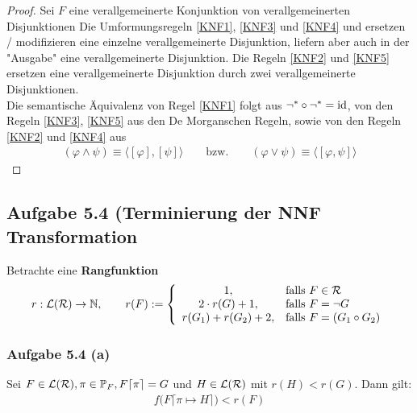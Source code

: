\begin{proof}
	Sei $F$ eine verallgemeinerte Konjunktion von verallgemeinerten Disjunktionen
	Die Umformungsregeln \eqref{KNF1}, \eqref{KNF3} und \eqref{KNF4} und ersetzen / modifizieren eine einzelne verallgemeinerte Disjunktion, liefern aber auch in der "Ausgabe" eine verallgemeinerte Disjunktion. 
	Die Regeln \eqref{KNF2} und \eqref{KNF5} ersetzen eine verallgemeinerte Disjunktion durch zwei verallgemeinerte Disjunktionen.\\
	Die semantische Äquivalenz von Regel \eqref{KNF1} folgt aus $\neg^\ast\circ\neg^\ast=\operatorname{id}$, von den Regeln \eqref{KNF3}, \eqref{KNF5} aus den De Morganschen  Regeln, sowie von den Regeln \eqref{KNF2} und \eqref{KNF4} aus 
	\begin{align*}
		(\varphi\wedge\psi)\equiv\big\langle[\varphi],[\psi]\big\rangle
		\qquad\text{bzw.}\qquad
		(\varphi\vee\psi)\equiv\big\langle[\varphi,\psi]\big\rangle
	\end{align*}
\end{proof}

\subsection{Aufgabe 5.4 (Terminierung der NNF Transformation}
Betrachte eine \textbf{Rangfunktion}
\begin{align*}
	r:\mathcal{L}(\mathcal{R})\to\mathbb{N},\qquad r(F):=\left\lbrace\begin{array}{cl}
		1, &\text{falls } F\in\mathcal{R}\\
		2\cdot r(G)+1, &\text{falls } F=\neg G\\
		r(G_1)+r(G_2)+2, &\text{falls } F=(G_1\circ G_2)
	\end{array}\right.
\end{align*}

\subsubsection{Aufgabe 5.4 (a)}
Sei $F\in\mathcal{L}(\mathcal{R}),\pi\in\mathbb{P}_F,F\lceil\pi\rceil=G$ und $H\in\mathcal{L}(\mathcal{R})$ mit $r(H)<r(G)$. 
Dann gilt:
\begin{align*}
	f\big(F\lceil\pi\mapsto H\rceil\big)<r(F)
\end{align*}

